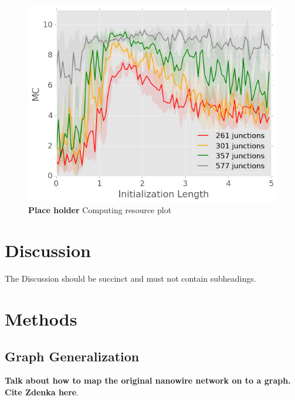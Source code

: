 \documentclass[fleqn,10pt,  reprint, amsmath,amssymb,aps, floatfix]{wlscirep}
\begin{document}
\begin{figure}
    \centering
	\includegraphics[width=0.5\linewidth]{figure/computing_resource.png}
	\caption{\textbf{Place holder} Computing resource plot}
	\label{fig:computing_resource}
\end{figure}

\clearpage





\section*{Discussion}

The Discussion should be succinct and must not contain subheadings.

\section*{Methods}

\subsection*{Graph Generalization}

\textbf{Talk about how to map the original nanowire network on to a graph. Cite Zdenka here}.
\end{document}
